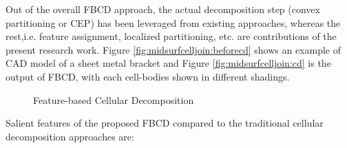 
Out of the overall FBCD approach, the actual decomposition step (convex partitioning or CEP) has been leveraged from existing approaches, whereas the rest,i.e. feature assignment, localized partitioning, etc. are contributions of the present research work. Figure \ref{fig:midsurfcelljoin:beforecd} shows an example of CAD model of a sheet metal bracket and Figure \ref{fig:midsurfcelljoin:cd} is the output of FBCD, with each cell-bodies shown in different shadings. 



\begin{figure}[!h]
\centering     %
{}
\qquad
\caption{Feature-based Cellular Decomposition}
\label{fig:midsurfcelljoin:fbcd}
\end{figure}




 Salient features of the proposed FBCD compared to the traditional cellular decomposition approaches are:


